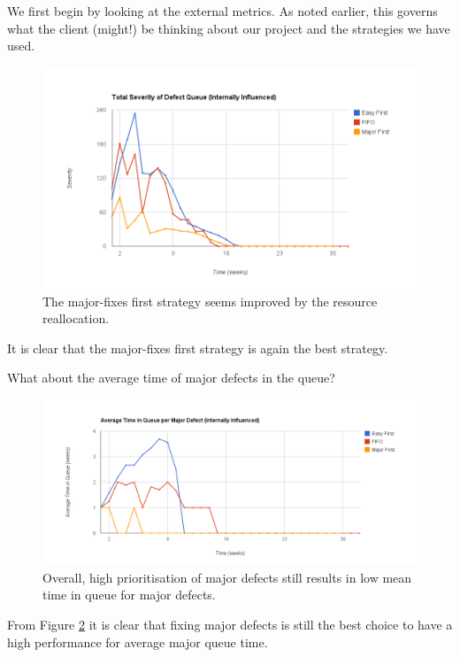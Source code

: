 \pagebreak

We first begin by looking at the external metrics.
As noted earlier, this governs what the client (might!) be thinking about our project and the strategies we have used.

\begin{figure}[ht!]
	\centering
	\includegraphics[scale=0.5]{graphs/QueueImpact_in.png}
	\caption{The major-fixes first strategy seems improved by the resource reallocation.}
	\label{in_qimpact}
\end{figure}

It is clear that the major-fixes first strategy is again the best strategy.

\pagebreak

What about the average time of major defects in the queue?

\begin{figure}[ht!]
	\centering
	\includegraphics[angle=90,scale=0.4]{graphs/avgMajorQueueTime_in.png}
	\caption{Overall, high prioritisation of major defects still results in low mean time in queue for
major defects.} 
	\label{in_avgmajqtime}
\end{figure}

From Figure \ref{in_avgmajqtime} it is clear that fixing major defects is still the best choice to have a
high performance for average major queue time.

